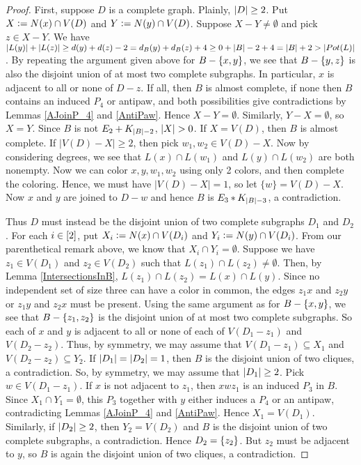 \begin{proof}

First, suppose $D$ is a complete graph.  Plainly, $\left|D\right| \geq 2$. Put $X
\mathrel{\mathop:}= N(x) \cap V(D)$ and $Y \mathrel{\mathop:}= N(y) \cap V(D)$. Suppose $X - Y
\neq \emptyset$ and pick $z \in X - Y$.  We have $\left|L(y)\right| + \left|L(z)\right| \ge
d(y) + d(z) - 2 = d_B(y) + d_B(z) + 4 \geq 0 + \left|B\right| - 2 + 4 = \left|B\right| +
2 > \left|Pot(L)\right|$. By repeating the argument given above for $B-\left\{ x,y \right\}$,
we see that $B - \left\{ y, z \right\}$ is also the disjoint union of at most two
complete subgraphs.  In particular, $x$ is adjacent to all or none of $D - z$. 
If all, then $B$ is almost complete, if none then $B$ contains an induced $P_4$
or antipaw, and both possibilities give contradictions by Lemmas \ref{AJoinP_4}
and \ref{AntiPaw}.  Hence $X - Y = \emptyset$.  Similarly, $Y - X = \emptyset$,
so $X = Y$.  Since $B$ is not $E_2 \mbox{\hspace{2 pt}$+$\hspace{2 pt}} K_{\left|B\right| - 2}$, $\left|X\right| >
0$.  If $X = V(D)$, then $B$ is almost complete.  If $|V(D)-X|\ge 2$, then pick
$w_1, w_2\in V(D)-X$.  Now by considering degrees, we see that $L(x)\cap
L(w_1)$ and $L(y)\cap L(w_2)$ are both nonempty.  Now we can color $x, y, w_1,
w_2$ using only 2 colors, and then complete the coloring.  Hence, we must have
$|V(D)-X|=1$, so let $\{w\}=V(D)-X$.  Now $x$ and $y$ are joined to $D - w$ and
hence $B$ is $E_3 \mbox{\hspace{2 pt}$\ast$\hspace{2 pt}} K_{\left|B\right| - 3}$, a contradiction.

Thus $D$ must instead be the disjoint union of two complete subgraphs $D_1$ and
$D_2$.  For each $i \in \left[2\right]$, put $X_i \mathrel{\mathop:}= N(x) \cap V(D_i)$ and
$Y_i \mathrel{\mathop:}= N(y) \cap V(D_i)$.  From our parenthetical remark above, we
know that $X_i \cap Y_i = \emptyset$.  Suppose we have $z_1 \in V(D_1)$ and
$z_2 \in V(D_2)$ such that $L(z_1) \cap L(z_2) \neq \emptyset$. Then, by Lemma
\ref{IntersectionsInB}, $L(z_1) \cap L(z_2) = L(x) \cap L(y)$.  Since no independent
set of size three can have a color in common, the edges $z_1x$ and $z_2y$ or
$z_1y$ and $z_2x$ must be present.
Using the same argument as for $B-\left\{ x,y \right\}$, we see that $B - \left\{ z_1, z_2 \right\}$
is the disjoint union of at most two complete subgraphs.  
So each of $x$ and $y$ is adjacent to all or none of each of $V(D_1-z_1)$ and
$V(D_2-z_2)$.
Thus, by symmetry, we may assume that $V(D_1 - z_1) \subseteq X_1$
and $V(D_2 - z_2) \subseteq Y_2$.  If $\left|D_1\right| = \left|D_2\right| = 1$, then $B$
is the disjoint union of two cliques, a contradiction.  So, by symmetry, we may
assume that $\left|D_1\right| \geq 2$.  Pick $w \in V(D_1 - z_1)$. If $x$ is not
adjacent to $z_1$, then $xwz_1$ is an induced $P_3$ in $B$.  Since $X_1 \cap
Y_1 = \emptyset$, this $P_3$ together with $y$ either induces a $P_4$ or an
antipaw, contradicting Lemmas \ref{AJoinP_4} and \ref{AntiPaw}.  Hence $X_1 =
V(D_1)$.  Similarly, if $\left|D_2\right| \geq 2$, then $Y_2 = V(D_2)$ and $B$ is the
disjoint union of two complete subgraphs, a contradiction.  Hence $D_2 =
\left\{ z_2 \right\}$.  But $z_2$ must be adjacent to $y$, so $B$ is again the disjoint
union of two cliques, a contradiction.


\end{proof}

